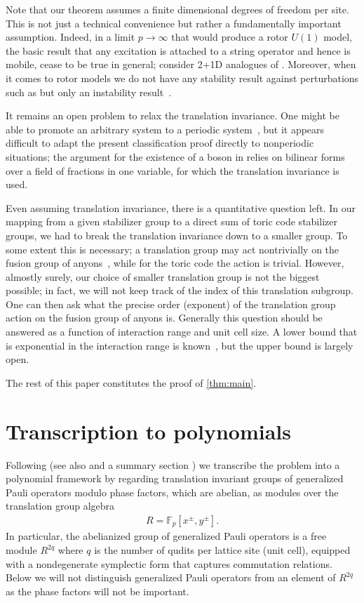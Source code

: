 \documentclass[aps,pra,
floatfix,notitlepage,
nofootinbib,
longbibliography,11pt]{revtex4-1}
\theoremstyle{definition}
\newcommand{\FF}{{\mathbb{F}}}
\begin{document}
Note that our theorem assumes a finite dimensional degrees of freedom per site.
This is not just a technical convenience but rather a fundamentally important assumption.
Indeed, in a limit $p \to \infty$ that would produce a rotor $U(1)$ model,
the basic result that any excitation is attached to a string operator and hence is mobile,
cease to be true in general; consider 2+1D analogues of \cite{Pretko2016}.
Moreover, when it comes to rotor models 
we do not have any stability result against perturbations such as \cite{BravyiHastingsMichalakis2010stability}
but only an instability result~\cite{Polyakov1975}.


It remains an open problem to relax the translation invariance.
One might be able to promote an arbitrary system to a periodic system~\cite{Hastings2013},
but it appears difficult to adapt the present classification proof directly
to nonperiodic situations;
the argument for the existence of a boson in \cite{HFH2018} 
relies on bilinear forms over a field of fractions in one variable,
for which the translation invariance is used.

Even assuming translation invariance,
there is a quantitative question left.
In our mapping from a given stabilizer group to a direct sum of toric code stabilizer groups,
we had to break the translation invariance down to a smaller group.
To some extent this is necessary;
a translation group may act nontrivially on the fusion group of anyons~\cite{Wen2003Plaquette},
while for the toric code the action is trivial.
However, almostly surely, our choice of smaller translation group is not the biggest possible;
in fact, we will not keep track of the index of this translation subgroup.
One can then ask what the precise order (exponent) 
of the translation group action on the fusion group of anyons is.
Generally this question should be answered as a function of 
interaction range and unit cell size.
A lower bound that is exponential in the interaction range is known~\cite[\S 7 Rem.~3]{Haah2013},
but the upper bound is largely open.


The rest of this paper constitutes the proof of \cref{thm:main}.

\section{Transcription to polynomials}

Following \cite{Haah2013} (see also \cite{Haah2016} and a summary section \cite[\S IV.A]{HFH2018})
we transcribe the problem into a polynomial framework
by regarding translation invariant groups of generalized Pauli operators modulo phase factors,
which are abelian, 
as modules over the translation group algebra
\begin{align}
R = \FF_p[x^\pm, y^\pm].
\end{align}
In particular, the abelianized group of generalized Pauli operators is a free module $R^{2q}$
where $q$ is the number of qudits per lattice site (unit cell),
equipped with a nondegenerate symplectic form that captures commutation relations.
Below we will not distinguish generalized Pauli operators from an element of $R^{2q}$
as the phase factors will not be important.
\end{document}
